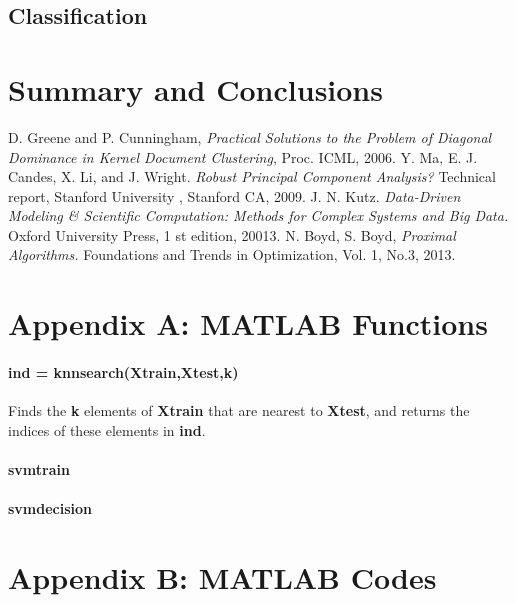 \documentclass[12pt]{article}
\begin{document}
\subsection{Classification}

\section{Summary and Conclusions}

\begin{thebibliography}{4}
 D. Greene and P. Cunningham, \emph{Practical Solutions to the Problem of Diagonal Dominance in Kernel Document Clustering}, Proc. ICML, 2006.
 Y. Ma, E. J. Candes, X. Li, and J. Wright. \emph{Robust Principal Component Analysis?} Technical report, Stanford University , Stanford CA, 2009.
 J. N. Kutz. \emph{Data-Driven Modeling \& Scientific Computation: Methods for Complex Systems and Big Data.} Oxford University Press, 1 st edition, 20013.
 N. Boyd, S. Boyd, \emph{Proximal Algorithms.} Foundations and Trends in Optimization, Vol. 1, No.3, 2013.
\end{thebibliography}

\newpage
\section*{Appendix A: MATLAB Functions}

\paragraph{ind = knnsearch(Xtrain,Xtest,k)} Finds the \textbf{k} elements of \textbf{Xtrain} that are nearest to \textbf{Xtest}, and returns the indices of these elements in \textbf{ind}.

\paragraph{svmtrain}

\paragraph{svmdecision}

\section*{Appendix B: MATLAB Codes}

\end{document}
